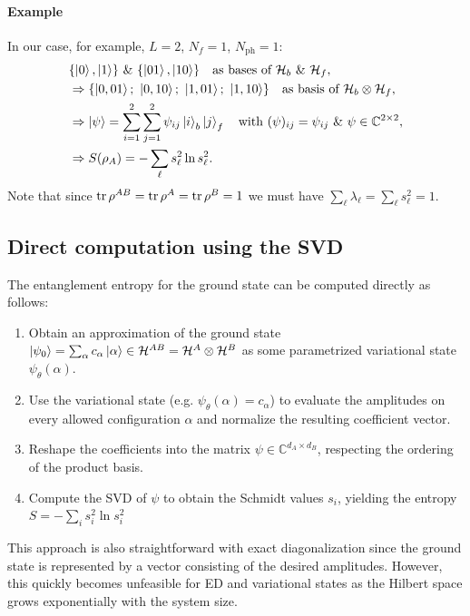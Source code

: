 \documentclass[../../main.tex]{subfiles}
\begin{document}
\paragraph{Example}

In our case, for example, $L=2$, $N_f=1$, $N_\mathrm{ph}=1$:
\begin{align}
& \{\left\lvert 0 \right\rangle,\left\lvert 1 \right\rangle\}\ \&\ \{\left\lvert 01 \right\rangle,\left\lvert 10 \right\rangle\}
\quad\text{as bases of }\mathcal H_b\ \&\ \mathcal H_f,\\
&\Rightarrow\{\left\lvert 0, 01 \right\rangle;\ \left\lvert 0, 10 \right\rangle;\ \left\lvert 1, 01 \right\rangle;\ \left\lvert 1, 10 \right\rangle\}
\quad\text{as basis of }\mathcal H_b\otimes\mathcal H_f,\\
&\Rightarrow\left\lvert \psi \right\rangle=\sum_{i=1}^{2}\sum_{j=1}^{2}\psi_{ij}\left\lvert i \right\rangle_b\left\lvert j \right\rangle_f
\quad\text{with }(\psi)_{ij}=\psi_{ij}\ \&\ \psi\in\mathbb C^{2\times2},\\
&\Rightarrow S(\rho_A)=-\sum_\ell s_\ell^2\ln s_\ell^2.
\end{align}
Note that since $\operatorname{tr}\rho^{AB}=\operatorname{tr}\rho^A=\operatorname{tr}\rho^B=1$ we must have
$\sum_\ell\lambda_\ell=\sum_\ell s_\ell^2=1$.


\subsection{Direct computation using the SVD}

The entanglement entropy for the ground state can be computed directly as follows:
\begin{enumerate}
\item Obtain an approximation of the ground state
      $\left\lvert \psi_0 \right\rangle=\sum_\alpha c_\alpha\left\lvert \alpha \right\rangle\in\mathcal H^{AB} = \mathcal H^{A} \otimes \mathcal H^{B} $ as some parametrized variational state $\psi_\theta(\alpha)$.
\item Use the variational state (e.g. $\psi_\theta(\alpha) = c_\alpha$) to evaluate the amplitudes on every allowed configuration $\alpha$ and normalize the resulting coefficient vector.
\item Reshape the coefficients into the matrix
      $\psi\in\mathbb C^{d_A\times d_B}$, respecting the ordering of the
      product basis.
\item Compute the SVD of $\psi$ to obtain the Schmidt values $s_i$, yielding the entropy $S=-\sum_i s_i^2\ln s_i^2$
\end{enumerate}
This approach is also straightforward with exact diagonalization since the ground state is represented by a vector consisting of the desired amplitudes. However, this quickly becomes unfeasible for ED and variational states as the Hilbert space grows exponentially with the system size.
\end{document}
